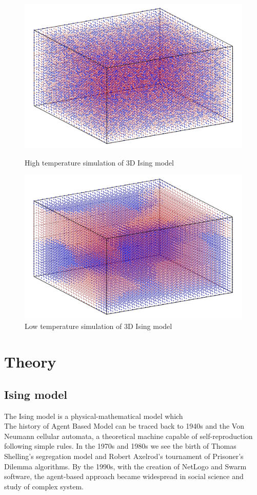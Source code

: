 \documentclass[11pt,a4paper]{article}
\begin{document}
\begin{figure}[h!]
\centering
\includegraphics[scale=0.25]{img/img1_intro.jpg} 
\caption[Source: "monteinsing code" https://inknos.github.io/monteising/]{High temperature simulation of 3D Ising model}
\includegraphics[scale=0.25]{img/img2_intro.jpg} 
\caption[Source: "monteinsing code" https://inknos.github.io/monteising/]{Low temperature simulation of 3D Ising model}
\end{figure}


\newpage 
\section{Theory}
\subsection{Ising model}
The Ising model is a physical-mathematical model which \\
The history of Agent Based Model can be traced back to 1940s and the Von Neumann cellular automata, a theoretical machine capable of self-reproduction following simple rules.
In the 1970s and 1980s we see the birth of Thomas Shelling's segregation model and Robert Axelrod's tournament of Prisoner's Dilemma algorithms.
By the 1990s, with the creation of NetLogo and Swarm software, the agent-based approach became widespread in social science and study of complex system.
\end{document}
